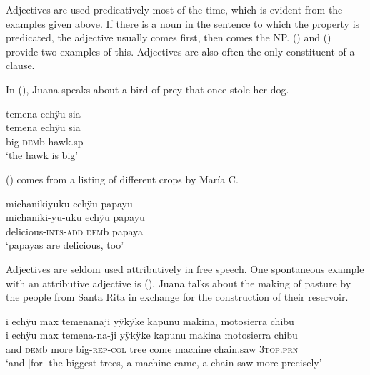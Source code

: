 Adjectives are used predicatively most of the time, which is evident from the examples given above. If there is a noun in the sentence to which the property is predicated, the adjective usually comes first, then comes the NP. () and () provide two examples of this. Adjectives are also often the only constituent of a clause.

In (), Juana speaks about a bird of prey that once stole her dog.

\ea\label{ex:ADJ-Pred-3}
\begingl
\glpreamble temena echÿu sia\\
\gla temena echÿu sia\\
\glb big \textsc{dem}b hawk.sp\\
\glft ‘the hawk is big’
\endgl
\trailingcitation{[jxx-a120516l-a.206]}%
\xe

() comes from a listing of different crops by María C.

\ea\label{ex:ADJ-Pred-1}
\begingl
\glpreamble michanikiyuku echÿu papayu\\
\gla michaniki-yu-uku echÿu papayu\\
\glb delicious-\textsc{ints}-\textsc{add} \textsc{dem}b papaya\\
\glft ‘papayas are delicious, too’
\endgl
\trailingcitation{[uxx-p110825l.193]}
\xe
{}

Adjectives are seldom used attributively in free speech. One spontaneous example with an attributive adjective is (). Juana talks about the making of pasture by the people from Santa Rita in exchange for the construction of their reservoir.

\ea\label{ex:ADJ-ATTR-1}
\begingl
\glpreamble i echÿu max temenanaji yÿkÿke kapunu makina, motosierra chibu\\
\gla i echÿu max temena-na-ji yÿkÿke kapunu makina motosierra chibu\\
\glb and \textsc{dem}b more big-\textsc{rep}-\textsc{col} tree come machine chain.saw 3\textsc{top.prn}\\
\glft ‘and [for] the biggest trees, a machine came, a chain saw more precisely’
\endgl
\trailingcitation{[jxx-p120515l-2.115]}
\xe

